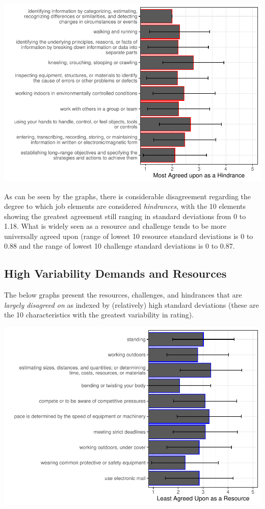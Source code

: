 \documentclass[
  english,
  man]{apa6}
\begin{document}
\includegraphics{JDR_3_Crosswalk_files/figure-latex/hindrancesagree-1.pdf}

As can be seen by the graphs, there is considerable disagreement regarding the degree to which job elements are considered \emph{hindrances}, with the 10 elements showing the greatest agreement still ranging in standard deviations from 0 to 1.18. What is widely seen as a resource and challenge tends to be more universally agreed upon (range of lowest 10 resource standard deviations is 0 to 0.88 and the range of lowest 10 challenge standard deviations is 0 to 0.87.

\hypertarget{high-variability-demands-and-resources}{%
\subsection{High Variability Demands and Resources}\label{high-variability-demands-and-resources}}

The below graphs present the resources, challenges, and hindrances that are \emph{largely disagreed on} as indexed by (relatively) high standard deviations (these are the 10 characteristics with the greatest variability in rating).

\includegraphics{JDR_3_Crosswalk_files/figure-latex/resourceshisd-1.pdf}
\end{document}
